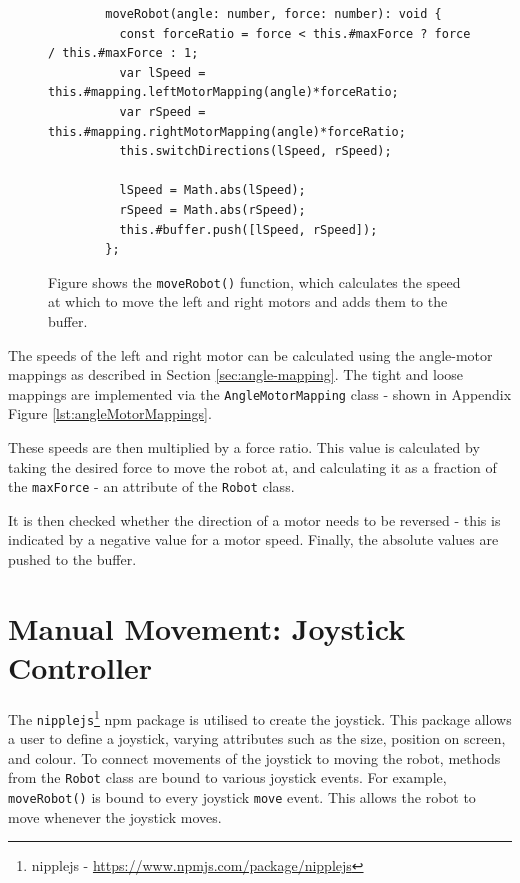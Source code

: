\documentclass{l4proj}
\begin{document}
\begin{figure}
    \centering
        \begin{lstlisting}
        moveRobot(angle: number, force: number): void {
          const forceRatio = force < this.#maxForce ? force / this.#maxForce : 1;
          var lSpeed = this.#mapping.leftMotorMapping(angle)*forceRatio;
          var rSpeed = this.#mapping.rightMotorMapping(angle)*forceRatio;
          this.switchDirections(lSpeed, rSpeed);
          
          lSpeed = Math.abs(lSpeed);
          rSpeed = Math.abs(rSpeed);
          this.#buffer.push([lSpeed, rSpeed]);
        };
        \end{lstlisting}
    \caption{Figure shows the \lstinline{moveRobot()} function, which calculates the speed at which to move the left and right motors and adds them to the buffer.}
    \label{lst:moveRobot}
\end{figure}


The speeds of the left and right motor can be calculated using the angle-motor mappings as described in Section \ref{sec:angle-mapping}. The tight and loose mappings are implemented via the \lstinline{AngleMotorMapping} class - shown in Appendix Figure \ref{lst:angleMotorMappings}.

These speeds are then multiplied by a force ratio. This value is calculated by taking the desired force to move the robot at, and calculating it as a fraction of the \lstinline{maxForce} - an attribute of the \lstinline{Robot} class.

It is then checked whether the direction of a motor needs to be reversed - this is indicated by a negative value for a motor speed. Finally, the absolute values are pushed to the buffer.


\section{Manual Movement: Joystick Controller}
The \lstinline{nipplejs}\footnote{nipplejs - \url{https://www.npmjs.com/package/nipplejs}} npm package is utilised to create the joystick. This package allows a user to define a joystick, varying attributes such as the size, position on screen, and colour. To connect movements of the joystick to moving the robot, methods from the \lstinline{Robot} class are bound to various joystick events. For example, \lstinline{moveRobot()} is bound to every joystick \lstinline{move} event. This allows the robot to move whenever the joystick moves.
\end{document}

